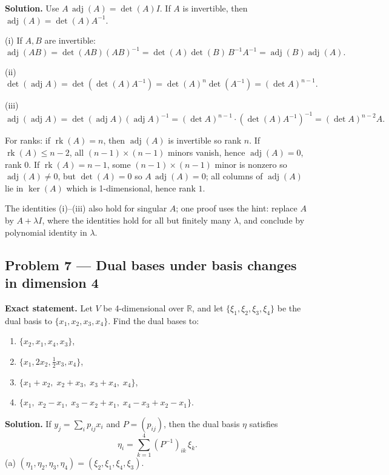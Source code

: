 \documentclass[12pt,a4paper]{article}
\theoremstyle{plain}
\theoremstyle{definition}      %
\begin{document}
\textbf{Solution.}
Use \(A\,\operatorname{adj}(A)=\det(A)I\). If \(A\) is invertible, then \(\operatorname{adj}(A)=\det(A)A^{-1}\).

(i) If \(A,B\) are invertible:
\[
\operatorname{adj}(AB)=\det(AB)(AB)^{-1}
=\det(A)\det(B)\,B^{-1}A^{-1}
=\operatorname{adj}(B)\operatorname{adj}(A).
\]

(ii)
\[
\det(\operatorname{adj}A)=\det(\det(A)A^{-1})=\det(A)^n\det(A^{-1})=(\det A)^{n-1}.
\]

(iii)
\[
\operatorname{adj}(\operatorname{adj}A)=\det(\operatorname{adj}A)(\operatorname{adj}A)^{-1}
=(\det A)^{n-1}\cdot (\det(A)A^{-1})^{-1}=(\det A)^{n-2}A.
\]

For ranks: if \(\operatorname{rk}(A)=n\), then \(\operatorname{adj}(A)\) is invertible so rank \(n\).
If \(\operatorname{rk}(A)\le n-2\), all \((n-1)\times(n-1)\) minors vanish, hence \(\operatorname{adj}(A)=0\), rank \(0\).
If \(\operatorname{rk}(A)=n-1\), some \((n-1)\times(n-1)\) minor is nonzero so \(\operatorname{adj}(A)\neq0\), but \(\det(A)=0\) so
\(A\,\operatorname{adj}(A)=0\); all columns of \(\operatorname{adj}(A)\) lie in \(\ker(A)\) which is 1-dimensional, hence rank \(1\).

The identities (i)--(iii) also hold for singular \(A\); one proof uses the hint: replace \(A\) by \(A+\lambda I\), where the identities hold for
all but finitely many \(\lambda\), and conclude by polynomial identity in \(\lambda\).

\subsection*{Problem 7 — Dual bases under basis changes in dimension 4}

\textbf{Exact statement.}
Let \(V\) be 4-dimensional over \(\mathbb R\), and let \(\{\xi_1,\xi_2,\xi_3,\xi_4\}\) be the dual basis to \(\{x_1,x_2,x_3,x_4\}\).
Find the dual bases to:
\begin{enumerate}
	\item[(a)] \(\{x_2,x_1,x_4,x_3\}\),
	\item[(b)] \(\{x_1,2x_2,\tfrac12 x_3,x_4\}\),
	\item[(c)] \(\{x_1+x_2,\;x_2+x_3,\;x_3+x_4,\;x_4\}\),
	\item[(d)] \(\{x_1,\;x_2-x_1,\;x_3-x_2+x_1,\;x_4-x_3+x_2-x_1\}\).
\end{enumerate}

\textbf{Solution.}
If \(y_j=\sum_i p_{ij}x_i\) and \(P=(p_{ij})\), then the dual basis \(\eta\) satisfies
\[
\eta_i=\sum_{k=1}^4 (P^{-1})_{ik}\,\xi_k.
\]
(a) \((\eta_1,\eta_2,\eta_3,\eta_4)=(\xi_2,\xi_1,\xi_4,\xi_3).\)
\end{document}
